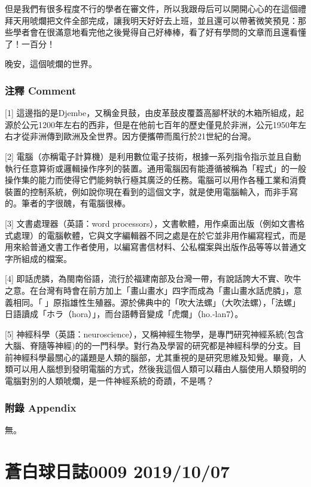 \documentclass[a5paper, 12pt
]{book}
\begin{document}
但是我們有很多程度不行的學者在審文件，所以我跟母后可以開開心心的在這個禮拜天用唬爛把文件全部完成，讓我明天好好去上班，並且還可以帶著微笑預見：那些學者會在很滿意地看完他之後覺得自己好棒棒，看了好有學問的文章而且還看懂了！一百分！

晚安，這個唬爛的世界。

\hypertarget{ux6ce8ux91cb-comment-1}{%
\subsubsection{注釋 Comment}\label{ux6ce8ux91cb-comment-1}}

{[}1{]}
這邊指的是Djembe，又稱金貝鼓，由皮革鼓皮覆蓋高腳杯狀的木箱所組成，起源於公元1200年左右的西非，但是在他前七百年的歷史僅見於非洲，公元1950年左右才從非洲傳到歐洲及全世界。因方便攜帶而風行於21世紀的台灣。

{[}2{]}
電腦（亦稱電子計算機）是利用數位電子技術，根據一系列指令指示並且自動執行任意算術或邏輯操作序列的裝置。通用電腦因有能遵循被稱為「程式」的一般操作集的能力而使得它們能夠執行極其廣泛的任務。電腦可以用作各種工業和消費裝置的控制系統，例如說你現在看到的這個文字，就是使用電腦輸入，而非手寫的。筆者的字很醜，有電腦很棒。

{[}3{]} 文書處理器（英語：word
processors），文書軟體，用作桌面出版（例如文書格式處理）的電腦軟體，它與文字編輯器不同之處是在於它並非用作編寫程式，而是用來給普通文書工作者使用，以編寫書信材料、公私檔案與出版作品等等以普通文字所組成的檔案。

{[}4{]}
即話虎膦，為閩南俗語，流行於福建南部及台灣一帶，有說話誇大不實、吹牛之意。在台灣有時會在前方加上「畫山畫水」四字而成為「畫山畫水話虎膦」，意義相同。「𡳞」原指雄性生殖器。源於佛典中的「吹大法螺」（大吹法螺），「法螺」日語讀成「ホラ（hora）」，而台語轉音變成「虎爛」（ho.-lan7）。

{[}5{]}
神經科學（英語：neuroscience），又稱神經生物學，是專門研究神經系統(包含大腦、脊隨等神經)的的一門科學。對行為及學習的研究都是神經科學的分支。目前神經科學最關心的議題是人類的腦部，尤其重視的是研究思維及知覺。畢竟，人類可以用人腦想到發明電腦的方式，然後我這個人類可以藉由人腦使用人類發明的電腦對別的人類唬爛，是一件神經系統的奇蹟，不是嗎？

\hypertarget{ux9644ux9304-appendix-1}{%
\subsubsection{附錄 Appendix}\label{ux9644ux9304-appendix-1}}

無。

\hypertarget{ux84bcux767dux7403ux65e5ux8a8c0009-20191007}{%
\section{蒼白球日誌0009
2019/10/07}\label{ux84bcux767dux7403ux65e5ux8a8c0009-20191007}}
\end{document}
